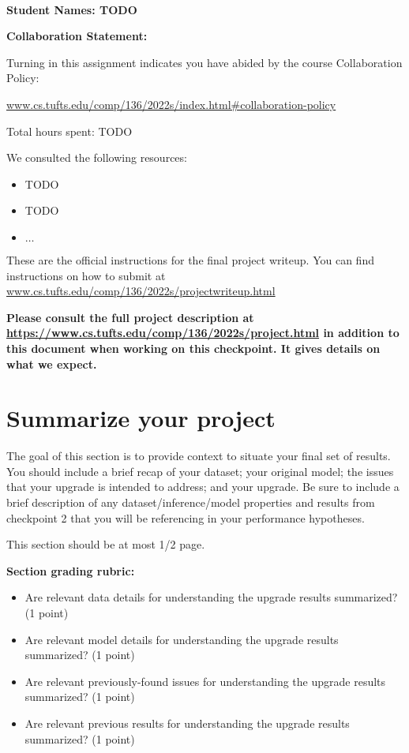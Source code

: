 \documentclass[12pt]{article}
\begin{document}
~~\\ %

{\Large{\bf Student Names: TODO}}


{\Large{\bf Collaboration Statement:}}

Turning in this assignment indicates you have abided by the course Collaboration Policy:

\url{www.cs.tufts.edu/comp/136/2022s/index.html#collaboration-policy}

Total hours spent: TODO

We consulted the following resources:
\begin{itemize}
\item TODO
\item TODO
\item $\ldots$	
\end{itemize}

\newpage

These are the official instructions for the final project writeup.  You can find instructions on how to submit at \url{www.cs.tufts.edu/comp/136/2022s/projectwriteup.html}

\textbf{Please consult the full project description at \url{https://www.cs.tufts.edu/comp/136/2022s/project.html} in addition to this document when working on this checkpoint.  It gives details on what we expect.}

\section{Summarize your project}

The goal of this section is to provide context to situate your final set of results.  You should include a brief recap of your dataset; your original model; the issues that your upgrade is intended to address; and your upgrade.  Be sure to include a brief description of any dataset/inference/model properties and results from checkpoint 2 that you will be referencing in your performance hypotheses.

This section should be at most 1/2 page.

\textbf{Section grading rubric:}
\begin{itemize}
	\item Are relevant data details for understanding the upgrade results summarized? (1 point)
	\item Are relevant model details for understanding the upgrade results summarized? (1 point)
	\item Are relevant previously-found issues for understanding the upgrade results summarized? (1 point)
	\item Are relevant previous results for understanding the upgrade results summarized? (1 point)
\end{itemize}
\end{document}
